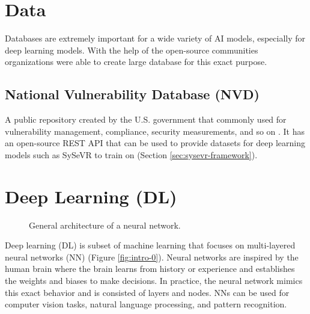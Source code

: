 \documentclass[12pt,twocolumn,letterpaper]{article}
\begin{document}
\section{Data}
\label{sec:data}

Databases are extremely important for a wide variety of AI models, especially for deep learning models. 
With the help of the open-source communities organizations were able to create large database for this 
exact purpose.

\subsection{National Vulnerability Database (NVD)}
\label{sub:nvd}

A public repository created by the U.S. government that commonly used for vulnerability management, 
compliance, security measurements, and so on \cite{Nist00}. It has an open-source REST API that can be 
used to provide datasets for deep learning models such as SySeVR to train on (Section \ref{sec:sysevr-framework}).

\section{Deep Learning (DL)}
\label{sec:deep-learning}

\begin{figure}[t]
    \centering

    \caption{General architecture of a neural network.}
    \label{fig:dl-0}
\end{figure}

Deep learning (DL) is subset of machine learning that focuses on multi-layered neural networks (NN)
(Figure \ref{fig:intro-0}). Neural networks are inspired by the human brain where the brain learns from 
history or experience and establishes the weights and biases to make decisions. In practice, the neural 
network mimics this exact behavior and is consisted of layers and nodes. NNs can be used for computer vision 
tasks, natural language processing, and pattern recognition.
\end{document}
